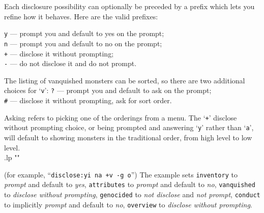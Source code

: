 Each disclosure possibility can optionally be preceded by a prefix which
lets you refine how it behaves.  Here are the valid prefixes:

{\tt y} --- prompt you and default to yes on the prompt;\\
{\tt n} --- prompt you and default to no on the prompt;\\
{\tt +} --- disclose it without prompting;\\
{\tt -} --- do not disclose it and do not prompt.

The listing of vanquished monsters can be sorted,
so there are two additional choices for `{\tt v}':
{\tt ?} --- prompt you and default to ask on the prompt;\\
{\tt\#} --- disclose it without prompting, ask for sort order.

Asking refers to picking one of the orderings from a menu.
The `{\tt +}' disclose without prompting choice,
or being prompted and answering `{\tt y}' rather than `{\tt a}',
will default to showing monsters in the traditional order,
from high level to low level.\\
.lp ""

(for example, ``{\tt disclose:yi na +v -g o}'')
The example sets
{\tt inventory} to {\it prompt\/} and default to {\it yes\/},
{\tt attributes} to {\it prompt\/} and default to {\it no\/},
{\tt vanquished} to {\it disclose without prompting\/},
{\tt genocided} to {\it not disclose\/} and {\it not prompt\/},
{\tt conduct} to implicitly {\it prompt\/} and default to {\it no\/},
{\tt overview} to {\it disclose without prompting\/}.

